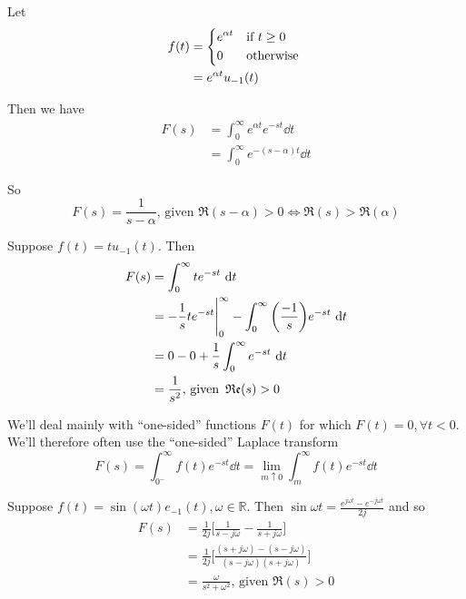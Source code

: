 \documentclass[12pt]{article}
\begin{document}
\begin{example}
Let
\begin{align*}
f(t) &=
\begin{dcases*}
e^{\alpha t} & if $t \geq 0$\\
0 & otherwise
\end{dcases*}\\
&= e^{\alpha t}u_{-1}(t)
\end{align*}

Then we have
\begin{align*}
F(s) &= \int_0^\infty e^{\alpha t} e^{-st} \dd t\\
&= \int_0^\infty e^{-(s-\alpha)t} \dd t
\end{align*}

So \[ F(s) = \frac{1}{s-\alpha} \text{, given }\Re(s-\alpha) > 0 \iff \Re(s) > \Re(\alpha) \]
\end{example}

\begin{example}
Suppose $f(t) = t u_{-1}(t)$. Then
\begin{align*}
F(s) &= \int_0^\infty t e^{-st} \ {\rm d} t\\
&= -\frac{1}{s}t e^{-st} \Bigg|_{0}^{\infty} - \int_0^\infty \bigg(\frac{-1}{s}\bigg) e^{-st} \ {\rm d} t\\
&= 0 - 0 + \frac{1}{s} \int_0^\infty e^{-st} \ {\rm d} t\\
&= \frac{1}{s^2} \text{, given }\operatorname{\mathfrak{Re}}(s) > 0
\end{align*}
\end{example}

We'll deal mainly with ``one-sided'' functions $F(t)$ for which $F(t) = 0, \forall t < 0$. We'll therefore often use the ``one-sided'' Laplace transform \[ F(s) = \int_{0^-}^\infty f(t) e^{-st} \dd t = \lim_{m\uparrow 0} \int_m^\infty f(t) e^{-st} \dd t \]

\begin{example}
Suppose $f(t) = \sin(\omega t) e_{-1}(t), \omega \in \mathbb{R}$. Then $\sin{\omega t} = \frac{e^{j\omega t} - e^{-j\omega t}}{2j}$ and so
\begin{align*}
F(s) &= \frac{1}{2j} \bigg[\frac{1}{s-j\omega} - \frac{1}{s+j\omega}\bigg]\\
&= \frac{1}{2j} \bigg[\frac{(s+j\omega) - (s - j\omega)}{(s-j\omega)(s + j\omega)}\bigg]\\
&= \frac{\omega}{s^2 + \omega^2}\text{, given }\Re(s) > 0
\end{align*}
\end{example}
\end{document}
